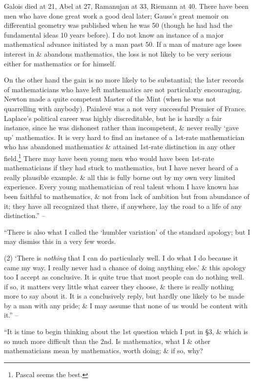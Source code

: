 \documentclass{article}
\numberwithin{equation}{section}
\begin{document}
Galois died at 21, Abel at 27, Ramanujan at 33, Riemann at 40. There have been men who have done great work a good deal later; Gauss's great memoir on differential geometry was published when he was 50 (though he had had the fundamental ideas 10 years before). I do not know an instance of a major mathematical advance initiated by a man past 50. If a man of mature age loses interest in \& abandons mathematics, the loss is not likely to be very serious either for mathematics or for himself.

On the other hand the gain is no more likely to be substantial; the later records of mathematicians who have left mathematics are not particularly encouraging. Newton made a quite competent Master of the Mint (when he was not quarrelling with anybody). Painlev\'e was a not very successful Premier of France. Laplace's political career was highly discreditable, but he is hardly a fair instance, since he was dishonest rather than incompetent, \& never really `gave up' mathematics. It is very hard to find an instance of a 1st-rate mathematician who has abandoned mathematics \& attained 1st-rate distinction in any other field.\footnote{Pascal seems the best.} There may have been young men who would have been 1st-rate mathematicians if they had stuck to mathematics, but I have never heard of a really plausible example. \& all this is fully borne out by my own very limited experience. Every young mathematician of real talent whom I have known has been faithful to mathematics, \& not from lack of ambition but from abundance of it; they have all recognized that there, if anywhere, lay the road to a life of any distinction.'' -- \cite[pp. 70--73]{Hardy1992}

 ``There is also what I called the `humbler variation' of the standard apology; but I may dismiss this in a very few words.

(2) `There is \textit{nothing} that I can do particularly well. I do what I do because it came my way. I really never had a chance of doing anything else.' \& this apology too I accept as conclusive. It is quite true that most people can do nothing well. if so, it matters very little what career they choose, \& there is really nothing more to say about it. It is a conclusively reply, but hardly one likely to be made by a man with any pride; \& I may assume that none of us would be content with it.'' -- \cite[p. 73]{Hardy1992}

 ``It is time to begin thinking about the 1st question which I put in \S3, \& which is so much more difficult than the 2nd. Is mathematics, what I \& other mathematicians mean by mathematics, worth doing; \& if so, why?
\end{document}
